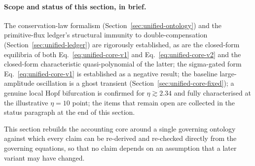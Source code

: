 \documentclass[twocolumn,10pt]{article}
\begin{document}
\paragraph{Scope and status of this section, in brief.} The conservation-law formalism (Section~\ref{sec:unified-ontology}) and the primitive-flux ledger's structural immunity to double-compensation (Section~\ref{sec:unified-ledger}) are rigorously established, as are the closed-form equilibria of both Eq.~\eqref{eq:unified-core-v1} and Eq.~\eqref{eq:unified-core-v2} and the closed-form characteristic quasi-polynomial of the latter; the sigma-gated form Eq.~\eqref{eq:unified-core-v1} is established as a negative result; the baseline large-amplitude oscillation is a ghost transient (Section~\ref{sec:unified-core-fixed}); a genuine local Hopf bifurcation is confirmed for $\eta\gtrsim2.34$ and fully characterised at the illustrative $\eta=10$ point; the items that remain open are collected in the status paragraph at the end of this section.

This section rebuilds the accounting core around a single governing ontology against which every claim can be re-derived and re-checked directly from the governing equations, so that no claim depends on an assumption that a later variant may have changed.
\end{document}
